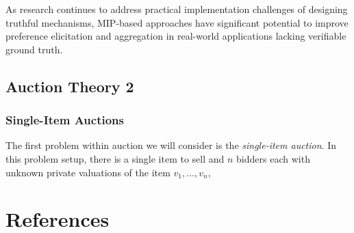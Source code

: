 \documentclass[
  letterpaper,
  DIV=11,
  numbers=noendperiod,
  oneside]{scrreprt}
\theoremstyle{remark}
\begin{document}
As research continues to address practical implementation challenges of
designing truthful mechanisms, MIP-based approaches have significant
potential to improve preference elicitation and aggregation in
real-world applications lacking verifiable ground truth.

\subsection{Auction Theory 2}\label{auction-theory-2}

\subsubsection*{Single-Item Auctions}\label{single-item-auctions-1}

The first problem within auction we will consider is the
\emph{single-item auction}. In this problem setup, there is a single
item to sell and \(n\) bidders each with unknown private valuations of
the item \(v_1, \ldots, v_n\),

\section*{References}\label{bibliography-4}

\end{document}
